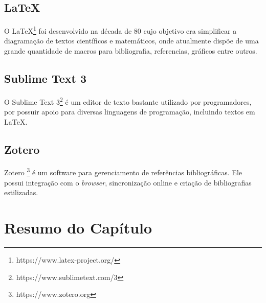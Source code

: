 	\subsection{LaTeX} %
	\label{sub:latex}
	
	O LaTeX\footnote{https://www.latex-project.org/} foi desenvolvido na década de 80 cujo objetivo era simplificar a diagramação de textos científicos e matemáticos, onde atualmente dispõe de uma grande quantidade de macros para bibliografia, referencias, gráficos entre outros.

	\subsection{Sublime Text 3} %
	\label{sub:sublime_text_3}
		O Sublime Text 3\footnote{https://www.sublimetext.com/3} é um editor de texto bastante utilizado por programadores, por possuir apoio para diversas linguagens de programação, incluindo textos em LaTeX.

	\subsection{Zotero} %
	\label{sub:zotero}
		Zotero \footnote{https://www.zotero.org} é um software para gerenciamento de referências bibliográficas. Ele possui integração com o \textit{browser}, sincronização online e criação de bibliografias estilizadas.
		
		
		
	\section{Resumo do Capítulo}